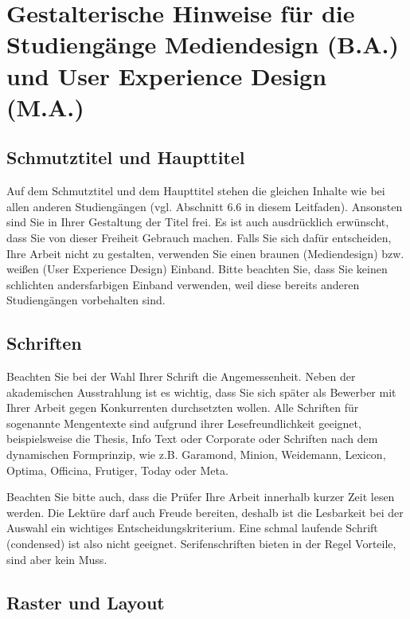 \chapter{Gestalterische Hinweise für die Studiengänge Mediendesign (B.A.) und User Experience Design (M.A.)}
\label{app:gestalterische-hinweise}

\section*{Schmutztitel und Haupttitel}

Auf dem Schmutztitel und dem Haupttitel stehen die gleichen Inhalte wie bei allen anderen Studiengängen (vgl. Abschnitt 6.6 in diesem Leitfaden). Ansonsten sind Sie in Ihrer Gestaltung der Titel frei. Es ist auch ausdrücklich erwünscht, dass Sie von dieser Freiheit Gebrauch machen. Falls Sie sich dafür entscheiden, Ihre Arbeit nicht zu gestalten, verwenden Sie einen braunen (Mediendesign) bzw. weißen (User Experience Design) Einband. Bitte beachten Sie, dass Sie keinen schlichten andersfarbigen Einband verwenden, weil diese bereits anderen Studiengängen vorbehalten sind.

\section*{Schriften}

Beachten Sie bei der Wahl Ihrer Schrift die Angemessenheit. Neben der akademischen Ausstrahlung ist es wichtig, dass Sie sich später als Bewerber mit Ihrer Arbeit gegen Konkurrenten durchsetzten wollen. Alle Schriften für sogenannte Mengentexte sind aufgrund ihrer Lesefreundlichkeit geeignet, beispielsweise die Thesis, Info Text oder Corporate oder Schriften nach dem dynamischen Formprinzip, wie z.B. Garamond, Minion, Weidemann, Lexicon, Optima, Officina, Frutiger, Today oder Meta.

Beachten Sie bitte auch, dass die Prüfer Ihre Arbeit innerhalb kurzer Zeit lesen werden. Die Lektüre darf auch Freude bereiten, deshalb ist die Lesbarkeit bei der Auswahl ein wichtiges Entscheidungskriterium. Eine schmal laufende Schrift (condensed) ist also nicht geeignet. Serifenschriften bieten in der Regel Vorteile, sind aber kein Muss.

\section*{Raster und Layout}

